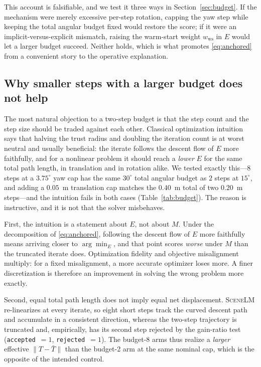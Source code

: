 \documentclass[10pt,twocolumn]{article}
\newcommand{\method}{\textsc{SceneLM}}
\begin{document}
This account is falsifiable, and we test it three ways in
Section~\ref{sec:budget}.  If the mechanism were merely excessive per-step
rotation, capping the yaw step while keeping the total angular budget fixed
would restore the score; if it were an implicit-versus-explicit mismatch,
raising the warm-start weight $w_{\mathrm{ws}}$ in $E$ would let a larger
budget succeed.  Neither holds, which is what promotes
\eqref{eq:anchored} from a convenient story to the operative explanation.

\subsection{Why smaller steps with a larger budget does not help}
\label{sec:finesteps}

The most natural objection to a two-step budget is that the step count and the
step size should be traded against each other.  Classical optimization
intuition says that halving the trust radius and doubling the iteration count
is at worst neutral and usually beneficial: the iterate follows the descent
flow of $E$ more faithfully, and for a nonlinear problem it should reach a
\emph{lower} $E$ for the same total path length, in translation and in rotation
alike.  We tested exactly this---$8$ steps at a $3.75^\circ$ yaw cap has the
same $30^\circ$ total angular budget as $2$ steps at $15^\circ$, and adding a
$0.05$~m translation cap matches the $0.40$~m total of two $0.20$~m steps---and
the intuition fails in both cases (Table~\ref{tab:budget}).  The reason is
instructive, and it is not that the solver misbehaves.

First, the intuition is a statement about $E$, not about $M$.  Under the
decomposition of \eqref{eq:anchored}, following the descent flow of $E$ more
faithfully means arriving closer to $\arg\min_E$, and that point scores
\emph{worse} under $M$ than the truncated iterate does.  Optimization fidelity
and objective misalignment multiply: for a fixed misalignment, a more accurate
optimizer loses more.  A finer discretization is therefore an improvement in
solving the wrong problem more exactly.

Second, equal total path length does not imply equal net displacement.
\method{} re-linearizes at every iterate, so eight short steps track the
curved descent path and accumulate in a consistent direction, whereas the
two-step trajectory is truncated and, empirically, has its second step rejected
by the gain-ratio test (\texttt{accepted}~$=1$, \texttt{rejected}~$=1$).  The
budget-8 arms thus realize a \emph{larger} effective $\|T-\bar T\|$ than the
budget-2 arm at the same nominal cap, which is the opposite of the intended
control.
\end{document}
